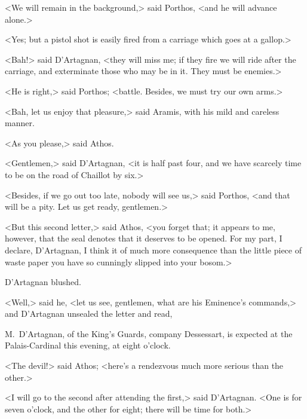 <We will remain in the background,> said Porthos, <and he will advance alone.> 

<Yes; but a pistol shot is easily fired from a carriage which goes at a gallop.> 

<Bah!> said D'Artagnan, <they will miss me; if they fire we will ride after the carriage, and exterminate those who may be in it. They must be enemies.> 

<He is right,> said Porthos; <battle. Besides, we must try our own arms.> 

<Bah, let us enjoy that pleasure,> said Aramis, with his mild and careless manner. 

<As you please,> said Athos. 

<Gentlemen,> said D'Artagnan, <it is half past four, and we have scarcely time to be on the road of Chaillot by six.> 

<Besides, if we go out too late, nobody will see us,> said Porthos, <and that will be a pity. Let us get ready, gentlemen.> 

<But this second letter,> said Athos, <you forget that; it appears to me, however, that the seal denotes that it deserves to be opened. For my part, I declare, D'Artagnan, I think it of much more consequence than the little piece of waste paper you have so cunningly slipped into your bosom.> 

D'Artagnan blushed. 

<Well,> said he, <let us see, gentlemen, what are his Eminence's commands,> and D'Artagnan unsealed the letter and read, 
\begin{letter}
\vspace{-1.5em}
\end{letter}
\begin{a4}
\vspace{-1.5em}
\enlargethispage{\baselineskip}
\end{a4}\begin{mail}{}{}
M.~D'Artagnan, of the King's Guards, company Dessessart, is expected at the Palais-Cardinal this evening, at eight o'clock. 
\end{mail}

<The devil!> said Athos; <here's a rendezvous much more serious than the other.> 

<I will go to the second after attending the first,> said D'Artagnan. <One is for seven o'clock, and the other for eight; there will be time for both.> 

